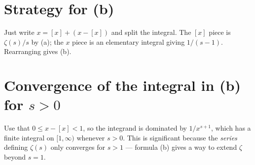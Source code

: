 \documentclass[12pt]{article}
\begin{document}
\section*{Strategy for (b)}
Just write $x = [x] + (x - [x])$ and split the integral. The $[x]$ piece is $\zeta(s)/s$ by (a); the $x$ piece is an elementary integral giving $1/(s-1)$. Rearranging gives (b).

\section*{Convergence of the integral in (b) for $s > 0$}
Use that $0 \leq x - [x] < 1$, so the integrand is dominated by $1/x^{s+1}$, which has a finite integral on $[1, \infty)$ whenever $s > 0$. This is significant because the \emph{series} defining $\zeta(s)$ only converges for $s > 1$ --- formula (b) gives a way to extend $\zeta$ beyond $s=1$.
\end{document}
